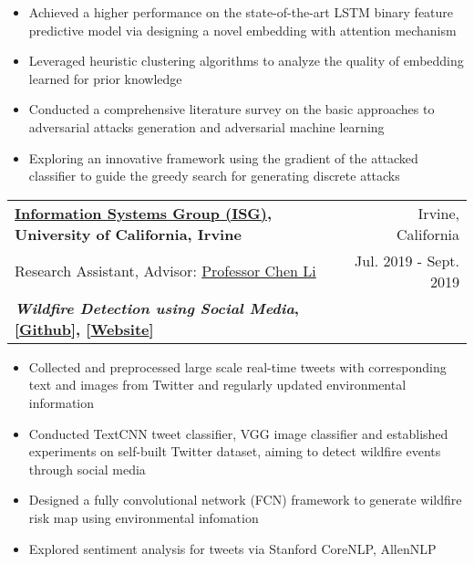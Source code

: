 \documentclass[letterpaper,11pt]{article}
\makeatletter
\newcommand{\resumeSubheading}[6]{
  \vspace{-1pt}\item
    \begin{tabular*}{0.97\textwidth}[t]{l@{\extracolsep{\fill}}r}
      \textbf{#1} & #2 \\
      #3 & #4 \\
      \textbf{#5} & \textbf{#6} \\
    \end{tabular*}\vspace{-5pt}
}
\makeatother
\begin{document}
        \begin{itemize}
          \item Achieved a higher performance on the state-of-the-art LSTM binary feature predictive model via designing a novel embedding with attention mechanism
          
          \item Leveraged heuristic clustering algorithms to analyze the quality of embedding learned for prior knowledge
          
          \item Conducted a comprehensive literature survey on the basic approaches to adversarial attacks generation and adversarial machine learning
          
          \item Exploring an innovative framework using the gradient of the attacked classifier to guide the greedy search for generating discrete attacks
          
        \end{itemize}
        
    \resumeSubheading
      {\href{https://isg.ics.uci.edu/}{Information Systems Group (ISG)}, University of California, Irvine}{Irvine, California}
      {Research Assistant, Advisor: \href{https://chenli.ics.uci.edu/}{Professor Chen Li}}{Jul. 2019 - Sept. 2019}
      {\textit{Wildfire Detection using Social Media}, [\href{https://github.com/ISG-ICS/Wildfires}{Github}], [\href{http://wildfires.ics.uci.edu:2333/}{Website}]}{}
      
        \begin{itemize}
          \item Collected and preprocessed large scale real-time tweets with corresponding text and images from Twitter and regularly updated environmental information
          
          \item Conducted TextCNN tweet classifier, VGG image classifier and established experiments on self-built Twitter dataset, aiming to detect wildfire events through social media
          
          \item Designed a fully convolutional network (FCN) framework to generate wildfire risk map using environmental infomation
          
          \item Explored sentiment analysis for tweets via Stanford CoreNLP, AllenNLP
        \end{itemize}
        
\end{document}
